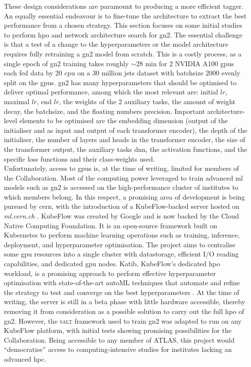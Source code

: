 These design considerations are paramount to producing a more efficient tagger. An equally essential endeavour is to fine-tune the architecture to extract the best performance from a chosen strategy. This section focuses on some initial studies to perform \gls{hpo} and network architecture search for \gls{gn2}. The essential challenge is that a test of a change to the hyperparameters or the model architecture requires fully retraining a \gls{gn2} model from scratch. This is a costly process, as a single epoch of \gls{gn2} training takes roughly $\sim$28 min for 2 NVIDIA A100 \glspl{gpu} each fed data by 20 \gls{cpu} on a 30 million jets dataset with batchsize 2000 evenly split on the \glspl{gpu}. \gls{gn2} has many hyperparameters that should be optimised to deliver optimal performance, among which the most relevant are: initial $lr$, maximal $lr$, end $lr$, the weights of the 2 auxiliary tasks, the amount of weight decay, the batchsize, and the floating numbers precision. Important architecture-level elements to be optimised are the embedding dimension (output of the initialiser and as input and output of each transformer encoder), the depth of the initialiser, the number of layers and heads in the transformer encoder, the size of the transformer output, the auxiliary tasks \gls{dnn}, the activation functions, and the specific loss functions and their class-weights used. \\

Unfortunately, access to \glspl{gpu} is, at the time of writing, limited for members of the Collaboration. Most of the computing power leveraged to train advanced \gls{ml} models such as \gls{gn2} is accessed on the high-performance cluster of institutes to which members belong. In this respect, a promising area of development is being pursued by \gls{cern}, with the introduction of a KubeFlow-backed server hosted on \textit{ml.cern.ch} \cite{KubeFlowCern}. KubeFlow was created by Google and is now backed by the Cloud Native Computing Foundation. It is an open-source framework built on Kubernetes to perform machine learning operations such as training, inference, deployment, and hyperparameter optimisation. The project aims to centralise some \gls{gpu} resources into a single cluster with datastorage, efficient I/O reading capabilities, and dedicated \gls{gpu} nodes. Katib, KubeFlow's dedicated \gls{hpo} workload, is a promising approach to perform effective hyperparameter optimisation with state-of-the-art autoML techniques that automate and refine the strategy to test and converge on the best hyperparameters \cite{george2020katib}. At the time of writing, the server is still in a beta phase with little hardware accessible, thereby removing it from consideration as a possible solution to carry out the full \gls{hpo} of \gls{gn2}. However, the \textsc{salt} framework used to train \gls{gn2} was adapted to run on any KubeFlow platform, with initial tests showing promising possibilities for the Collaboration. Being accessible to any member of ATLAS, this project would ``democratise'' access to computing-intensive studies for institutes lacking an advanced \gls{hpc}. \\

